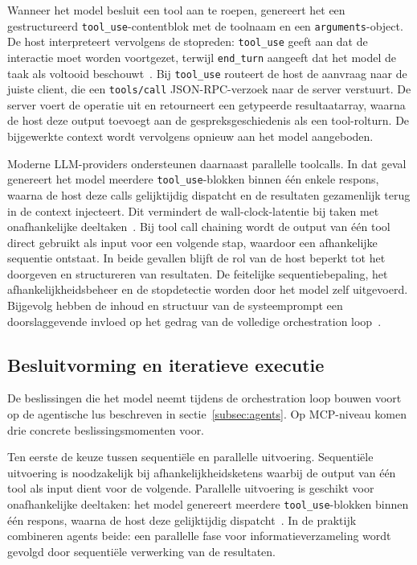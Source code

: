 Wanneer het model besluit een tool aan te roepen, genereert het een gestructureerd \texttt{tool\_use}-contentblok met de toolnaam en een \texttt{arguments}-object. De host interpreteert vervolgens de stopreden: \texttt{tool\_use} geeft aan dat de interactie moet worden voortgezet, terwijl \texttt{end\_turn} aangeeft dat het model de taak als voltooid beschouwt~\cite{mcpspec2025architecture}. Bij \texttt{tool\_use} routeert de host de aanvraag naar de juiste client, die een \texttt{tools/call} JSON-RPC-verzoek naar de server verstuurt. De server voert de operatie uit en retourneert een getypeerde resultaatarray, waarna de host deze output toevoegt aan de gespreksgeschiedenis als een tool-rolturn. De bijgewerkte context wordt vervolgens opnieuw aan het model aangeboden.

Moderne LLM-providers ondersteunen daarnaast parallelle toolcalls. In dat geval genereert het model meerdere \texttt{tool\_use}-blokken binnen één enkele respons, waarna de host deze calls gelijktijdig dispatcht en de resultaten gezamenlijk terug in de context injecteert. Dit vermindert de wall-clock-latentie bij taken met onafhankelijke deeltaken~\cite{mcpspec2025tools}. Bij tool call chaining wordt de output van één tool direct gebruikt als input voor een volgende stap, waardoor een afhankelijke sequentie ontstaat. In beide gevallen blijft de rol van de host beperkt tot het doorgeven en structureren van resultaten. De feitelijke sequentiebepaling, het afhankelijkheidsbeheer en de stopdetectie worden door het model zelf uitgevoerd. Bijgevolg hebben de inhoud en structuur van de systeemprompt een doorslaggevende invloed op het gedrag van de volledige orchestration loop~\cite{Luo2025MCPUniverse}.

\subsection{Besluitvorming en iteratieve executie}\label{subsec:decision-making}

De beslissingen die het model neemt tijdens de orchestration loop bouwen voort op de agentische lus beschreven in sectie~\ref{subsec:agents}. Op MCP-niveau komen drie concrete beslissingsmomenten voor.

Ten eerste de keuze tussen sequentiële en parallelle uitvoering. Sequentiële uitvoering is noodzakelijk bij afhankelijkheidsketens waarbij de output van één tool als input dient voor de volgende. Parallelle uitvoering is geschikt voor onafhankelijke deeltaken: het model genereert meerdere \texttt{tool\_use}-blokken binnen één respons, waarna de host deze gelijktijdig dispatcht~\cite{mcpspec2025tools}. In de praktijk combineren agents beide: een parallelle fase voor informatieverzameling wordt gevolgd door sequentiële verwerking van de resultaten.

